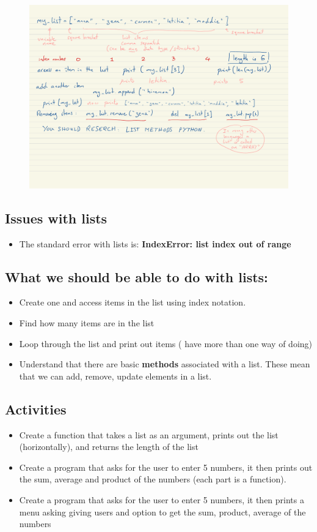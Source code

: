 \documentclass[a4paper,12pt]{article}
\begin{document}
\begin{figure}[!ht]
	\centering
	\includegraphics[width=17cm]{lists.pdf}
\end{figure}





\subsection{Issues with lists}
\begin{itemize}
	\item The standard error with lists is:  \textbf{IndexError: list index out of range}
\end{itemize}
\subsection{What we should be able to do with lists:}
\begin{itemize}
	\item Create one and access items in the list using index notation.
	\item Find how many items are in the list
	\item Loop through the list and print out items ( have more than one way of doing)
	\item Understand that there are basic \textbf{methods} associated with a list. These mean that we can add, remove, update elements in a list.
\end{itemize}
\subsection{Activities}
\begin{itemize}
	\item Create a function that takes a list as an argument, prints out the list (horizontally), and returns the length of the list
	\item Create a program that asks for the user to enter 5 numbers, it then prints out the sum, average  and product of the numbers (each part is a function).
	\item Create a program that asks for the user to enter 5 numbers, it then prints a menu asking giving users and option to get the sum, product, average of the numbers
\end{itemize}
\end{document}
